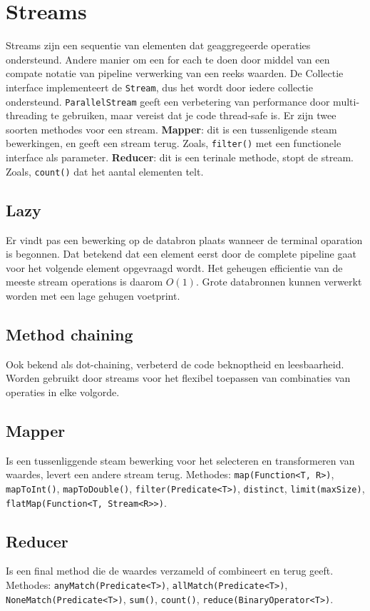 \section{Streams}
Streams zijn een sequentie van elementen dat geaggregeerde operaties ondersteund.
Andere manier om een for each te doen door middel van een compate notatie van pipeline verwerking van een reeks waarden.
De Collectie interface implementeert de \texttt{Stream}, dus het wordt door iedere collectie ondersteund.
\texttt{ParallelStream} geeft een verbetering van performance door multi-threading te gebruiken, maar vereist dat je code thread-safe is.
Er zijn twee soorten methodes voor een stream.
\textbf{Mapper}: dit is een tussenligende steam bewerkingen, en geeft een stream terug.
Zoals, \texttt{filter()} met een functionele interface als parameter.
\textbf{Reducer}: dit is een terinale methode, stopt de stream.
Zoals, \texttt{count()} dat het aantal elementen telt.

\subsection{Lazy}
Er vindt pas een bewerking op de databron plaats wanneer de terminal oparation is begonnen.
Dat betekend dat een element eerst door de complete pipeline gaat voor het volgende element opgevraagd wordt.
Het geheugen efficientie van de meeste stream operations is daarom $O(1)$.
Grote databronnen kunnen verwerkt worden met een lage gehugen voetprint.

\subsection{Method chaining}
Ook bekend als dot-chaining, verbeterd de code beknoptheid en leesbaarheid.
Worden gebruikt door streams voor het flexibel toepassen van combinaties van operaties in elke volgorde.

\subsection{Mapper}
Is een tussenliggende steam bewerking voor het selecteren en transformeren van waardes, levert een andere stream terug.
Methodes: \texttt{map(Function<T, R>)}, \texttt{mapToInt()}, \texttt{mapToDouble()}, \texttt{filter(Predicate<T>)}, \texttt{distinct}, \texttt{limit(maxSize)}, \texttt{flatMap(Function<T, Stream<R>>)}.

\subsection{Reducer}
Is een final method die de waardes verzameld of combineert en terug geeft.
Methodes: \texttt{anyMatch(Predicate<T>)}, \texttt{allMatch(Predicate<T>)}, \texttt{NoneMatch(Predicate<T>)}, \texttt{sum()}, \texttt{count()}, \texttt{reduce(BinaryOperator<T>)}.

